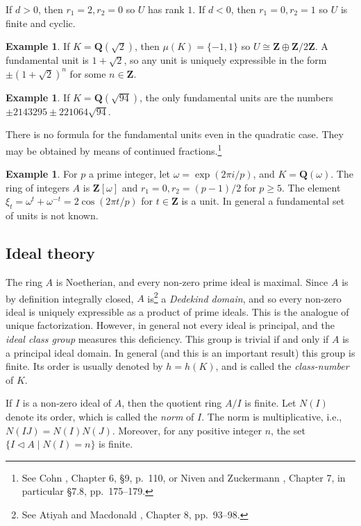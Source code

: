 \documentclass[10pt]{article}
\theoremstyle{definition}
\newtheorem{exam}[theo]{Example}
\def\ZZ{\mathbf{Z}}
\def\QQ{\mathbf{Q}}
\newcommand{\tri}{\mathbin{\triangleleft}}
\def\fnonfi{See Cohn \cite{bib:36}, Chapter 6, \S9, p.~110, or Niven and Zuckermann \cite{bib:148}, Chapter 7, in particular \S7.8, pp.~175--179.}
\def\fnonsi{See Atiyah and Macdonald \cite{bib:17}, Chapter 8, pp.~93--98.}
\begin{document}
If $d > 0$, then $r_1 = 2, r_2 = 0$ so $U$ has rank $1$.
If $d < 0$, then $r_1 = 0, r_2 = 1$ so $U$ is finite and cyclic.


\begin{exam}
\label{2.1.2}
If $K = \QQ(\sqrt 2)$, then $\mu(K) = \{-1,1\}$ so $U \cong \ZZ \oplus \ZZ / 2 \ZZ$.
A fundamental unit is $1 + \sqrt 2$, so any unit is uniquely expressible in the form $\pm(1 + \sqrt 2)^n$ for some $n \in \ZZ$.
\end{exam}


\begin{exam}
\label{2.1.3}
If $K = \QQ(\sqrt{94})$, the only fundamental units are the numbers $\pm 2143295 \pm 221064 \sqrt{94}$.
\end{exam}

There is no formula for the fundamental units even in the quadratic case.
They may be obtained by means of continued fractions.\footnote{\fnonfi}


\begin{exam}
For $p$ a prime integer, let $\omega = \exp(2 \pi i / p)$, and $K = \QQ(\omega)$.
The ring of integers $A$ is $\ZZ[\omega]$ and $r_1 = 0, r_2 = (p-1)/2$ for $p \geq 5$.
The element $\xi_t = \omega^t + \omega^{-t} = 2\cos(2 \pi t / p)$ for $t \in \ZZ$ is a unit.
In general a fundamental set of units is not known.
\end{exam}


\subsection{Ideal theory}
\label{ch:2.2}

The ring $A$ is Noetherian, and every non-zero prime ideal is maximal.
Since $A$ is by definition integrally closed, $A$ is\footnote{\fnonsi} a \emph{Dedekind domain}, and so every non-zero ideal is uniquely expressible as a product of prime ideals.
This is the analogue of unique factorization.
However, in general not every ideal is principal, and the \emph{ideal class group} measures this deficiency.
This group is trivial if and only if $A$ is a principal ideal domain.
In general (and this is an important result) this group is finite.
Its order is usually denoted by $h = h(K)$, and is called the \emph{class-number} of $K$.

If $I$ is a non-zero ideal of $A$, then the quotient ring $A / I$ is finite.
Let $N(I)$ denote its order, which is called the \emph{norm} of $I$.
The norm is multiplicative, i.e., $N(IJ) = N(I) N(J)$.
Moreover, for any positive integer $n$, the set $\{ I \tri A \mid N(I) = n\}$ is finite.
\end{document}
